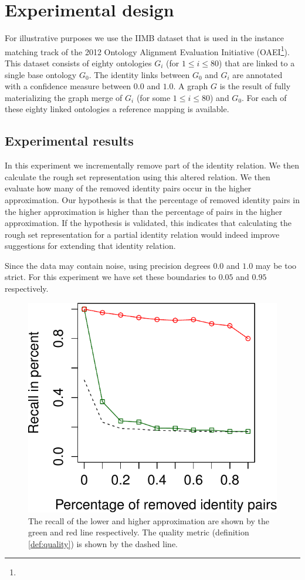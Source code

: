 \section{Experimental design}
\label{sec:experimental_design}

For illustrative purposes we use the IIMB dataset that is used in the
  instance matching track of the 2012 Ontology Alignment Evaluation
  Initiative (OAEI\footnote{}).
This dataset consists of eighty ontologies $G_i$ (for $1 \leq i \leq 80$)
  that are linked to a single base ontology $G_0$.
The identity links between $G_0$ and $G_i$ are annotated with a
  confidence measure between $0.0$ and $1.0$.
A graph $G$ is the result of fully materializing the graph merge
  of $G_i$ (for some $1 \leq i \leq 80$) and $G_0$.
For each of these eighty linked ontologies a reference mapping is available.



\subsection{Experimental results}

In this experiment we incrementally remove part of the identity relation.
We then calculate the rough set representation using this altered relation.
We then evaluate how many of the removed identity pairs occur in
  the higher approximation.
Our hypothesis is that the percentage of removed identity pairs
  in the higher approximation is higher than the percentage of pairs
  in the higher approximation.
If the hypothesis is validated, this indicates that
  calculating the rough set representation for a partial identity relation
  would indeed improve suggestions for extending that identity relation.

Since the data may contain noise, using precision degrees $0.0$ and $1.0$
  may be too strict. For this experiment we have set these boundaries
  to $0.05$ and $0.95$ respectively.

\begin{figure}
\label{fig:recall_quality}
\centering
\includegraphics[width=0.8\linewidth]{./img/recall_quality}
\caption{
  The recall of the lower and higher approximation
    are shown by the green and red line respectively.
  The quality metric (definition \ref{def:quality})
    is shown by the dashed line.
}
\end{figure}

